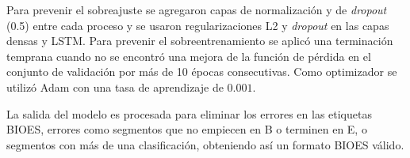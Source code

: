 \documentclass[a4paper,11pt,twocolumn,twoside]{article}
\begin{document}
Para prevenir el sobreajuste se agregaron capas de normalización y de \textit{dropout} (0.5) entre cada proceso y se usaron regularizaciones
L2 y \textit{dropout} en las capas densas y LSTM. 
Para prevenir el sobreentrenamiento se aplicó una 
terminación temprana cuando no se encontró una mejora de la función de pérdida en el conjunto de validación
por más de 10 épocas consecutivas. Como optimizador se utilizó Adam con una tasa de aprendizaje de $0.001$.

La salida del modelo es procesada para eliminar los errores en las etiquetas BIOES, errores como segmentos 
que no empiecen en B o terminen en E, o segmentos con más de una clasificación, 
obteniendo así un formato BIOES válido.


\end{document}
